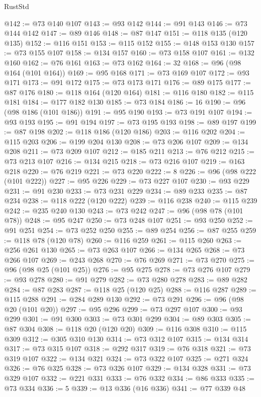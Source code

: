 \begin{lexlean}{RustStd}
\begin{coremodule}
@142 := @73 @140 @107
@143 := @93 @142
@144 := @91 @143
@146 := @73 @144 @142
@147 := @89 @146
@148 := @87 @147
@151 := @118 @135 (@120 @135)
@152 := @116 @151
@153 := @115 @152
@155 := @148 @153 @130
@157 := @73 @155 @107
@158 := @134 @157
@160 := @73 @158 @107
@161 := @132 @160
@162 := @76 @161
@163 := @73 @162
@164 := 32
@168 := @96 (@98 @164 (@101 @164))
@169 := @95 @168
@171 := @73 @169 @107
@172 := @93 @171
@173 := @91 @172
@175 := @73 @173 @171
@176 := @89 @175
@177 := @87 @176
@180 := @118 @164 (@120 @164)
@181 := @116 @180
@182 := @115 @181
@184 := @177 @182 @130
@185 := @73 @184
@186 := 16
@190 := @96 (@98 @186 (@101 @186))
@191 := @95 @190
@193 := @73 @191 @107
@194 := @93 @193
@195 := @91 @194
@197 := @73 @195 @193
@198 := @89 @197
@199 := @87 @198
@202 := @118 @186 (@120 @186)
@203 := @116 @202
@204 := @115 @203
@206 := @199 @204 @130
@208 := @73 @206 @107
@209 := @134 @208
@211 := @73 @209 @107
@212 := @185 @211
@213 := @76 @212
@215 := @73 @213 @107
@216 := @134 @215
@218 := @73 @216 @107
@219 := @163 @218
@220 := @76 @219
@221 := @73 @220
@222 := 8
@226 := @96 (@98 @222 (@101 @222))
@227 := @95 @226
@229 := @73 @227 @107
@230 := @93 @229
@231 := @91 @230
@233 := @73 @231 @229
@234 := @89 @233
@235 := @87 @234
@238 := @118 @222 (@120 @222)
@239 := @116 @238
@240 := @115 @239
@242 := @235 @240 @130
@243 := @73 @242
@247 := @96 (@98 @78 (@101 @78))
@248 := @95 @247
@250 := @73 @248 @107
@251 := @93 @250
@252 := @91 @251
@254 := @73 @252 @250
@255 := @89 @254
@256 := @87 @255
@259 := @118 @78 (@120 @78)
@260 := @116 @259
@261 := @115 @260
@263 := @256 @261 @130
@265 := @73 @263 @107
@266 := @134 @265
@268 := @73 @266 @107
@269 := @243 @268
@270 := @76 @269
@271 := @73 @270
@275 := @96 (@98 @25 (@101 @25))
@276 := @95 @275
@278 := @73 @276 @107
@279 := @93 @278
@280 := @91 @279
@282 := @73 @280 @278
@283 := @89 @282
@284 := @87 @283
@287 := @118 @25 (@120 @25)
@288 := @116 @287
@289 := @115 @288
@291 := @284 @289 @130
@292 := @73 @291
@296 := @96 (@98 @20 (@101 @20))
@297 := @95 @296
@299 := @73 @297 @107
@300 := @93 @299
@301 := @91 @300
@303 := @73 @301 @299
@304 := @89 @303
@305 := @87 @304
@308 := @118 @20 (@120 @20)
@309 := @116 @308
@310 := @115 @309
@312 := @305 @310 @130
@314 := @73 @312 @107
@315 := @134 @314
@317 := @73 @315 @107
@318 := @292 @317
@319 := @76 @318
@321 := @73 @319 @107
@322 := @134 @321
@324 := @73 @322 @107
@325 := @271 @324
@326 := @76 @325
@328 := @73 @326 @107
@329 := @134 @328
@331 := @73 @329 @107
@332 := @221 @331
@333 := @76 @332
@334 := @86 @333
@335 := @73 @334
@336 := 5
@339 := @13 @336 (@16 @336)
@341 := @77 @339 @48

\end{coremodule}
\end{lexlean}
